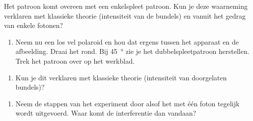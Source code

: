 \documentclass[../../main.tex]{subfiles}
\begin{document}
Het patroon komt overeen met een enkelspleet patroon. Kun je deze waarneming verklaren met klassieke theorie (intensiteit van de bundels) en vanuit het gedrag van enkele fotonen?
\vspace{0.125in}
\notepadlines[4]

\begin{enumerate}[resume]
\item Neem nu een los vel polaroid en hou dat ergens tussen het apparaat en de afbeelding. Draai het rond. Bij \SI{45}{\degree} zie je het dubbelspleetpatroon herstellen. Trek het patroon over op het werkblad.
\end{enumerate}

\vspace{0.1in}
\noindent{}%


\begin{enumerate}[resume]
\item Kun je dit verklaren met klassieke theorie (intensiteit van doorgelaten bundels)?
\end{enumerate}
\notepadlines[5]
\vspace{0.25in}
 
\begin{enumerate}[resume]
\item \label{itm:last}Neem de stappen van het experiment door alsof het met \'e\'en foton tegelijk wordt uitgevoerd. Waar komt de interferentie dan vandaan?
\end{enumerate}
\notepadlines[5]
\end{document}
